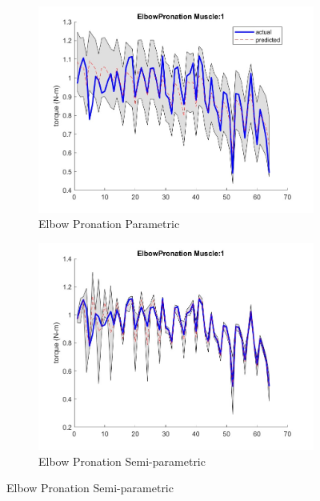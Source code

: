 \begin{figure}[htbp]
    \centering
    \begin{subfigure}[b]{0.45\linewidth}
        \includegraphics[height=0.15\textheight]{Pictures/Results/GPR/ElbowPronation_1Parametric.jpg}
        \caption{Elbow Pronation Parametric}
    \end{subfigure}
    \hfill
    \begin{subfigure}[b]{0.45\linewidth}
        \includegraphics[height=0.15\textheight]{Pictures/Results/GPR/ElbowPronation_1Semiparametric.jpg}
        \caption{Elbow Pronation Semi-parametric}
    \end{subfigure}
    

\end{figure}
